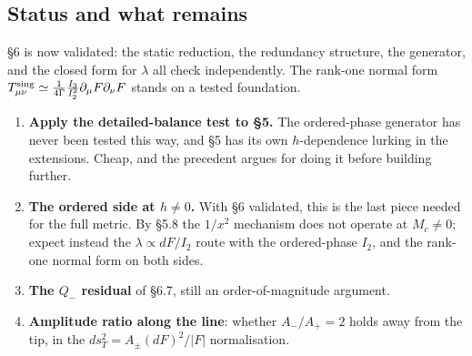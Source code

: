\subsection{Status and what remains}
\label{sec:remaining7}
\S6 is now validated: the static reduction, the redundancy structure, the generator, and the
closed form for $\lambda$ all check independently. The rank-one normal form
$T^{\rm sing}_{\mu\nu}\simeq\frac{1}{4\Gamma}\frac{I_3}{I_2^{2}}\partial_\mu F\partial_\nu F$
stands on a tested foundation.

\begin{enumerate}
  \item \textbf{Apply the detailed-balance test to \S5.} The ordered-phase generator has
        never been tested this way, and \S5 has its own $h$-dependence lurking in the
        extensions. Cheap, and the precedent argues for doing it before building further.
  \item \textbf{The ordered side at $h\neq0$.} With \S6 validated, this is the last piece
        needed for the full metric. By \S5.8 the $1/x^{2}$ mechanism does not operate at
        $M_c\neq0$; expect instead the $\lambda\propto dF/I_2$ route with the ordered-phase
        $I_2$, and the rank-one normal form on both sides.
  \item \textbf{The $Q_-$ residual} of \S6.7, still an order-of-magnitude argument.
  \item \textbf{Amplitude ratio along the line}: whether $A_-/A_+=2$ holds away from the
        tip, in the $ds_T^{2}=A_\pm(dF)^{2}/|F|$ normalisation.
\end{enumerate}


